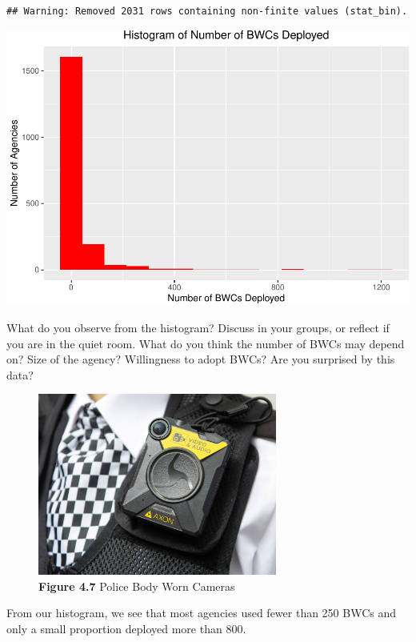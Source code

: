 \documentclass[
]{book}
\begin{document}
\begin{verbatim}
## Warning: Removed 2031 rows containing non-finite values (stat_bin).
\end{verbatim}

\includegraphics{04-descriptive-statistics_files/figure-latex/unnamed-chunk-45-1.pdf}

What do you observe from the histogram? Discuss in your groups, or reflect if you are in the quiet room. What do you think the number of BWCs may depend on? Size of the agency? Willingness to adopt BWCs? Are you surprised by this data?

\begin{figure}
\centering
\includegraphics[width=0.7\textwidth,height=\textheight]{Images/bwcs.jpg}
\caption{\textbf{Figure 4.7} Police Body Worn Cameras}
\end{figure}

From our histogram, we see that most agencies used fewer than 250 BWCs and only a small proportion deployed more than 800.
\end{document}
